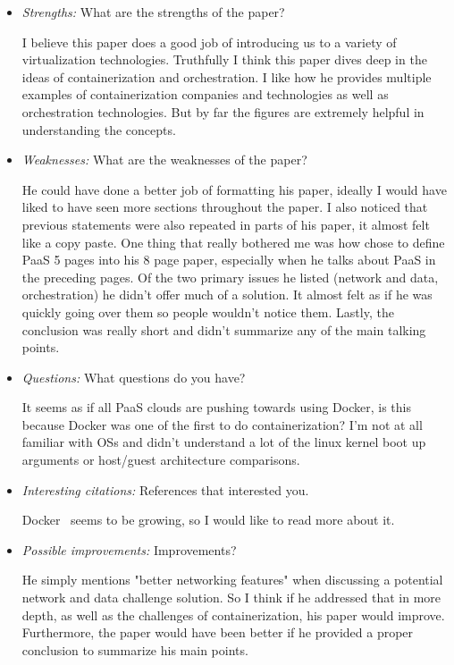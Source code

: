 \documentclass[letterpaper,twocolumn,10pt]{article}
\begin{document}
\begin{itemize}

\item {\it Strengths:} What are the strengths of the paper? 

I believe this paper does a good job of introducing us to a variety of virtualization technologies. Truthfully I think this paper
dives deep in the ideas of containerization and orchestration. I like how he provides multiple examples of containerization
companies and technologies as well as orchestration technologies. But by far the figures are extremely helpful in 
understanding the concepts. 

\item {\it Weaknesses:} What are the weaknesses of the paper? 

He could have done a better job of formatting his paper, ideally I would have liked to have seen more sections throughout
the paper. I also noticed that previous statements were also repeated in parts of his paper, it almost felt like a copy paste. 
One thing that really bothered me was how chose to define PaaS 5 pages into his 8 page paper, especially when he talks 
about PaaS in the preceding pages. Of the two primary issues he listed (network and data, orchestration) he didn't offer 
much of a solution. It almost felt as if he was quickly going over them so people wouldn't notice them. Lastly, the conclusion 
was really short and didn't summarize any of the main talking points. 

\item {\it Questions:} What questions do you have?

It seems as if all PaaS clouds are pushing towards using Docker, is this because Docker was one of the first to do containerization? 
I'm not at all familiar with OSs and didn't understand a lot of the linux kernel boot up arguments or host/guest architecture comparisons. 

\item {\it Interesting citations:} References that interested you.

Docker~\cite{docker} seems to be growing, so I would like to read more about it. 

\item {\it Possible improvements:} Improvements?

He simply mentions
"better networking features" when discussing a potential network and data challenge solution. So I think if he addressed that 
in more depth, as well as the challenges of containerization, his paper would improve. Furthermore, the paper would have been
better if he provided a proper conclusion to summarize his main points. 



\end{itemize}
\end{document}
